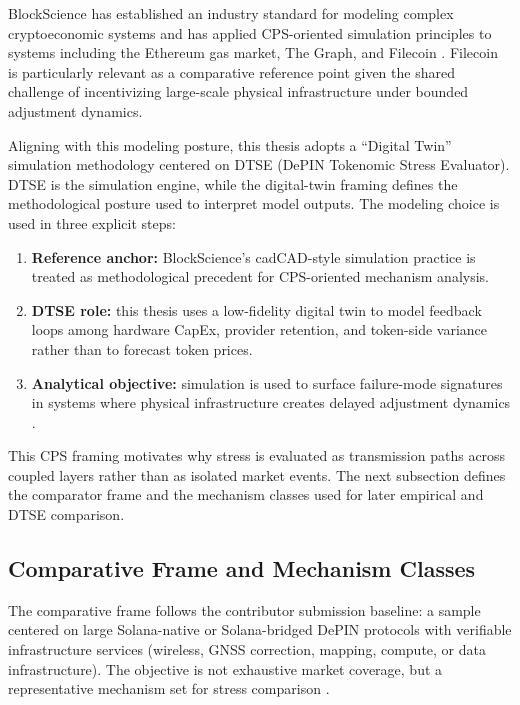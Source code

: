 BlockScience has established an industry standard for modeling complex cryptoeconomic systems and has applied CPS-oriented simulation principles to systems including the Ethereum gas market, The Graph, and Filecoin \cite{Bernardineli2022, McConaghy2020}. Filecoin is particularly relevant as a comparative reference point given the shared challenge of incentivizing large-scale physical infrastructure under bounded adjustment dynamics.

Aligning with this modeling posture, this thesis adopts a ``Digital Twin'' simulation methodology centered on DTSE (DePIN Tokenomic Stress Evaluator). DTSE is the simulation engine, while the digital-twin framing defines the methodological posture used to interpret model outputs. The modeling choice is used in three explicit steps:
\begin{enumerate}
    \item \textbf{Reference anchor:} BlockScience's cadCAD-style simulation practice is treated as methodological precedent for CPS-oriented mechanism analysis.
    \item \textbf{DTSE role:} this thesis uses a low-fidelity digital twin to model feedback loops among hardware CapEx, provider retention, and token-side variance rather than to forecast token prices.
    \item \textbf{Analytical objective:} simulation is used to surface failure-mode signatures in systems where physical infrastructure creates delayed adjustment dynamics \cite{Bernardineli2022}.
\end{enumerate}

This CPS framing motivates why stress is evaluated as transmission paths across coupled layers rather than as isolated market events. The next subsection defines the comparator frame and the mechanism classes used for later empirical and DTSE comparison.

\subsection{Comparative Frame and Mechanism Classes}
\label{subsec:solana_scope}
The comparative frame follows the contributor submission baseline: a sample centered on large Solana-native or Solana-bridged DePIN protocols with verifiable infrastructure services (wireless, GNSS correction, mapping, compute, or data infrastructure). The objective is not exhaustive market coverage, but a representative mechanism set for stress comparison \cite{Messari2024, CoinMarketCapDePIN}.

